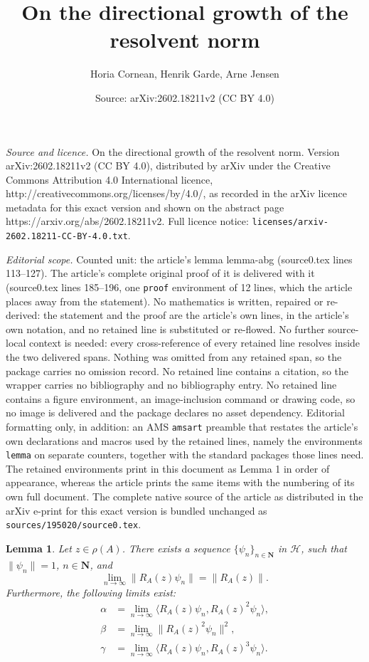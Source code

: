 \documentclass[10pt,a4paper]{amsart}
\title{On the directional growth of the resolvent norm}
\author{Horia Cornean, Henrik Garde, Arne Jensen}
\date{Source: arXiv:2602.18211v2 (CC BY 4.0)}
\newtheorem{lemma}{Lemma}
\newcommand{\bN}{\mathbf{N}}
\newcommand{\cH}{\mathcal{H}}
\newcommand{\ip}[2]{\langle{#1},{#2}\rangle} %
\newcommand{\norm}[1]{\lVert{#1}\rVert} %
\begin{document}
\maketitle

\noindent\emph{Source and licence.} On the directional growth of the resolvent norm. Version arXiv:2602.18211v2 (CC BY 4.0), distributed by arXiv under the Creative Commons Attribution 4.0 International licence, http://creativecommons.org/licenses/by/4.0/, as recorded in the arXiv licence metadata for this exact version and shown on the abstract page https://arxiv.org/abs/2602.18211v2. Full licence notice: \texttt{licenses/arxiv-2602.18211-CC-BY-4.0.txt}.\par\smallskip

\noindent\textit{Editorial scope.} Counted unit: the article's lemma lemma-abg (source0.tex lines 113--127). The article's complete original proof of it is delivered with it (source0.tex lines 185--196, one \texttt{proof} environment of 12 lines, which the article places away from the statement). No mathematics is written, repaired or re-derived: the statement and the proof are the article's own lines, in the article's own notation, and no retained line is substituted or re-flowed.  No further source-local context is needed: every cross-reference of every retained line resolves inside the two delivered spans.  Nothing was omitted from any retained span, so the package carries no omission record.  No retained line contains a citation, so the wrapper carries no bibliography and no bibliography entry.  No retained line contains a figure environment, an image-inclusion command or drawing code, so no image is delivered and the package declares no asset dependency.  Editorial formatting only, in addition: an AMS \texttt{amsart} preamble that restates the article's own declarations and macros used by the retained lines, namely the environments \texttt{lemma} on separate counters, together with the standard packages those lines need.  The retained environments print in this document as Lemma 1 in order of appearance, whereas the article prints the same items with the numbering of its own full document.  The complete native source of the article as distributed in the arXiv e-print for this exact version is bundled unchanged as \texttt{sources/195020/source0.tex}.
\begin{lemma}\label{lemma-abg}
	Let $z\in\rho(A)$. There exists a sequence $\{\psi_n\}_{n\in\bN}$ in $\cH$, such that $\norm{\psi_n}=1$, $n\in\bN$, and 
	\begin{equation}\label{R-lim}
		\lim_{n\to\infty}\norm{R_A(z)\psi_n}=\norm{R_A(z)}.
	\end{equation}
	Furthermore, the following limits exist:
	\begin{align}
		\alpha &=\lim_{n\to\infty} \ip{R_A(z)\psi_n}{R_A(z)^2\psi_n},\label{alpha}\\
		\beta &= \lim_{n\to\infty}\norm{R_A(z)^2\psi_n}^2,\label{beta}\\
		\gamma &= \lim_{n\to\infty}\ip{R_A(z)\psi_n}{R_A(z)^3\psi_n}.\label{gamma} 
	\end{align}
\end{lemma} 
\end{document}
